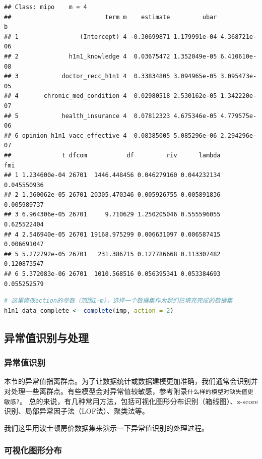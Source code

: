 \documentclass[]{ctexbook}
\newcommand{\passthrough}[1]{#1}
\begin{document}
\begin{lstlisting}
## Class: mipo    m = 4 
##                          term m    estimate         ubar            b
## 1                 (Intercept) 4 -0.30699871 1.179991e-04 4.368721e-06
## 2              h1n1_knowledge 4  0.03675472 1.352049e-05 6.410610e-08
## 3            doctor_recc_h1n1 4  0.33834805 3.094965e-05 3.095473e-05
## 4       chronic_med_condition 4  0.02980518 2.530162e-05 1.342220e-07
## 5            health_insurance 4  0.07812323 4.675346e-05 4.779575e-06
## 6 opinion_h1n1_vacc_effective 4  0.08385005 5.085296e-06 2.294296e-07
##              t dfcom           df         riv      lambda         fmi
## 1 1.234600e-04 26701  1446.448456 0.046279160 0.044232134 0.045550936
## 2 1.360062e-05 26701 20305.470346 0.005926755 0.005891836 0.005989737
## 3 6.964306e-05 26701     9.710629 1.250205046 0.555596055 0.625522404
## 4 2.546940e-05 26701 19168.975299 0.006631097 0.006587415 0.006691047
## 5 5.272792e-05 26701   231.386715 0.127786668 0.113307482 0.120873547
## 6 5.372083e-06 26701  1010.568516 0.056395341 0.053384693 0.055252579
\end{lstlisting}

\begin{lstlisting}[language=R]
# 这里修改action的参数（范围1-m），选择一个数据集作为我们已填充完成的数据集
h1n1_data_complete <- complete(imp, action = 2)
\end{lstlisting}

\hypertarget{ux5f02ux5e38ux503cux8bc6ux522bux4e0eux5904ux7406}{%
\subsection{异常值识别与处理}\label{ux5f02ux5e38ux503cux8bc6ux522bux4e0eux5904ux7406}}

\hypertarget{ux5f02ux5e38ux503cux8bc6ux522b}{%
\subsubsection{异常值识别}\label{ux5f02ux5e38ux503cux8bc6ux522b}}

本节的异常值指离群点。为了让数据统计或数据建模更加准确，我们通常会识别并对处理一些离群点。有些模型会对异常值较敏感，参考附录\passthrough{\lstinline!什么样的模型对缺失值更敏感?!}。
总的来说，有几种常用方法，包括可视化图形分布识别（箱线图）、z-score识别、局部异常因子法（LOF法）、聚类法等。

我们这里用波士顿房价数据集来演示一下异常值识别的处理过程。

\hypertarget{ux53efux89c6ux5316ux56feux5f62ux5206ux5e03}{%
\subsubsection{可视化图形分布}\label{ux53efux89c6ux5316ux56feux5f62ux5206ux5e03}}
\end{document}
